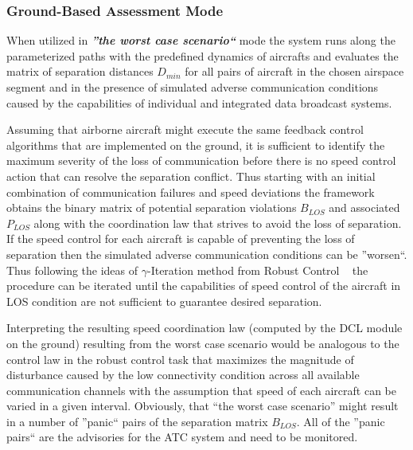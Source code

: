 \documentclass[letter,onecolumn,12pt]{aiaa-tc}
\newcommand{\1}{1_n}
\begin{document}
\subsubsection{Ground-Based Assessment Mode}

When utilized in \textbf{\emph{''the worst case scenario``}} mode the system runs along the  parameterized paths with the predefined dynamics of aircrafts and evaluates the matrix of separation distances $D_{min}$ for all pairs of aircraft in the chosen airspace segment  and in the presence of simulated adverse communication conditions caused by the capabilities of individual and integrated data broadcast systems.

Assuming that airborne aircraft might execute the same feedback control algorithms that are implemented on the ground, it is sufficient to identify the maximum severity of the loss of communication before there is no speed control action that can resolve the separation conflict. Thus starting with an initial combination of communication failures and speed deviations the framework obtains the binary matrix of potential separation violations $B_{LOS}$ and associated $P_{LOS}$ along with the coordination law that strives to avoid the loss of separation. If  the speed control for each aircraft is capable of preventing the loss of separation then the simulated adverse communication conditions can be ''worsen``. Thus following the ideas of $\gamma$-Iteration method from Robust Control ~\cite{zhou1998essentials} the procedure can be iterated until the capabilities of speed control of the aircraft in LOS condition are not sufficient to guarantee desired separation.

Interpreting the resulting speed coordination law (computed by the DCL module on the ground) resulting from the worst case scenario would be analogous to the control law in the robust control task that maximizes the magnitude of disturbance caused by the low connectivity condition across all available communication channels with the assumption that speed of each aircraft can be varied in a given interval.
Obviously, that ``the worst case scenario'' might result in a number of ''panic`` pairs of the separation matrix $B_{LOS}$. All of the ''panic pairs`` are the advisories for the ATC system and need to be monitored.
\end{document}
